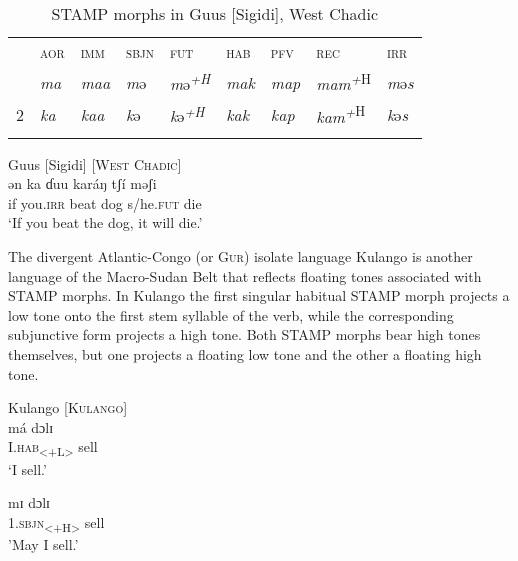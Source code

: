\documentclass[output=paper]{langsci/langscibook}
\begin{document}
\begin{table}
\caption{STAMP morphs in Guus [Sigidi], West Chadic \citep[8-9]{Caron2001}}
\label{tab:Anderson:3}

\begin{tabularx}{\textwidth}{XXXXXXXXX} & \scshape aor & \scshape imm & \scshape sbjn & \scshape fut & \scshape hab & \scshape pfv & \scshape rec & \scshape irr\\
\lsptoprule
1 & \itshape ma & \itshape maa & \textit{m}ə & \textit{m}ə\textit{\textsuperscript{+H}} & \itshape mak & \itshape map & \textit{mam}\textit{\textsuperscript{+}}\textsuperscript{H} & \textit{m}ə\textit{s}\\
2 & \itshape ka & \itshape kaa & \textit{k}ə & \textit{k}ə\textit{\textsuperscript{+H}} & \itshape kak & \itshape kap & \textit{kam}\textit{\textsuperscript{+}}\textsuperscript{H} & \textit{k}ə\textit{s}\\
\lspbottomrule
\end{tabularx}
\end{table}

\ea\label{ex:anderson:13}
Guus [Sigidi]  \citep[11]{Caron2001}          \textsc{[West Chadic]}\\
\gll ən  ka    ɗuu  karáŋ    tʃí    məʃi\\
if  you\textsc{.irr}  beat  dog    s/he\textsc{.fut}  die\\
\glt `If you beat the dog, it will die.'   
\z

The divergent Atlantic-Congo (or \textsc{Gur)} isolate language Kulango is another language of the Macro-Sudan Belt that reflects floating tones associated with STAMP morphs. In Kulango  the first singular habitual STAMP morph projects a low tone onto the first stem syllable of the verb, while the corresponding subjunctive form projects a high tone. Both STAMP morphs bear high tones themselves, but one projects a floating low tone and the other a floating high tone.

\ea\label{ex:anderson:14}
Kulango \citep[193]{Elders2007}          [K\textsc{ulango}]\\
\ea\label{ex:anderson:14a}
\gll má     dɔlɪ  \\
  \textsc{I.hab}\textsubscript{<+L>}  sell\\        
\glt `I sell.'            

\ex \label{ex:anderson:14b}
\gll mɪ    dɔlɪ\\
  1.\textsc{sbjn}\textsubscript{<+H>}  sell\\
\glt 'May I sell.'
\z
\z
\end{document}
